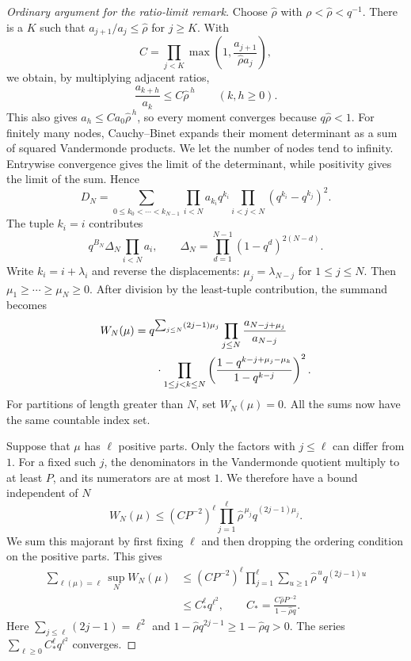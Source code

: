 \documentclass[11pt]{article}
\begin{document}
\begin{proof}[Ordinary argument for the ratio-limit remark]
Choose $\widehat\rho$ with $\rho<\widehat\rho<q^{-1}$.
There is a $K$ such that $a_{j+1}/a_j\le\widehat\rho$ for $j\ge K$.
With
\[
 C=\prod_{j<K}\max\left(1,\frac{a_{j+1}}{\widehat\rho a_j}\right),
\]
we obtain, by multiplying adjacent ratios,
\begin{equation}\label{long1049:eq:ratio-shift-bound}
 \frac{a_{k+h}}{a_k}\le C\widehat\rho^{\,h}\qquad(k,h\ge0).
\end{equation}
This also gives $a_h\le Ca_0\widehat\rho^{\,h}$, so every moment
converges because $q\widehat\rho<1$.
For finitely many nodes,
Cauchy--Binet expands their moment determinant as a sum of squared
Vandermonde products. We let the number of nodes tend to infinity.
Entrywise convergence gives the limit of the determinant, while
positivity gives the limit of the sum. Hence
\begin{equation}\label{long1049:eq:ratio-heine}
 D_N=\sum_{0\le k_0<\cdots<k_{N-1}}
 \prod_{i<N}a_{k_i}q^{k_i}
 \prod_{i<j<N}(q^{k_i}-q^{k_j})^2.
\end{equation}
The tuple $k_i=i$ contributes
\[
 q^{B_N}\Delta_N\prod_{i<N}a_i,\qquad
 \Delta_N=\prod_{d=1}^{N-1}(1-q^d)^{2(N-d)}.
\]
Write $k_i=i+\lambda_i$ and reverse the displacements:
$\mu_j=\lambda_{N-j}$ for $1\le j\le N$. Then
$\mu_1\ge\cdots\ge\mu_N\ge0$. After division by the least-tuple
contribution, the summand becomes
\begin{equation}\label{long1049:eq:ratio-partition}
\begin{split}
 W_N(\mu)={}&q^{\sum_{j\le N}(2j-1)\mu_j}
 \prod_{j\le N}\frac{a_{N-j+\mu_j}}{a_{N-j}}\\
 &\hspace{2mm}\cdot\prod_{1\le j<k\le N}
 \left(\frac{1-q^{k-j+\mu_j-\mu_k}}{1-q^{k-j}}\right)^2.
\end{split}
\end{equation}
For partitions of length greater than $N$, set $W_N(\mu)=0$.
All the sums now have the same countable index set.

Suppose that $\mu$ has $\ell$ positive parts. Only the factors with
$j\le\ell$ can differ from $1$. For a fixed such $j$, the denominators
in the Vandermonde quotient multiply to at least $P$, and its
numerators are at most $1$. We therefore have a bound independent
of $N$
\[
 W_N(\mu)\le (CP^{-2})^\ell
 \prod_{j=1}^{\ell}\widehat\rho^{\,\mu_j}q^{(2j-1)\mu_j}.
\]
We sum this majorant by first fixing $\ell$ and then dropping the
ordering condition on the positive parts. This gives
\begin{align*}
 \sum_{\ell(\mu)=\ell}\sup_N W_N(\mu)
 &\le(CP^{-2})^\ell\prod_{j=1}^{\ell}
        \sum_{u\ge1}\widehat\rho^{\,u} q^{(2j-1)u}\\
 &\le C_*^{\ell}q^{\ell^2},\qquad
 C_*=\frac{C\widehat\rho P^{-2}}{1-\widehat\rho q}.
\end{align*}
Here $\sum_{j\le\ell}(2j-1)=\ell^2$ and
$1-\widehat\rho q^{2j-1}\ge1-\widehat\rho q>0$.
The series $\sum_{\ell\ge0}C_*^{\ell}q^{\ell^2}$ converges.


\end{proof}
\end{document}
